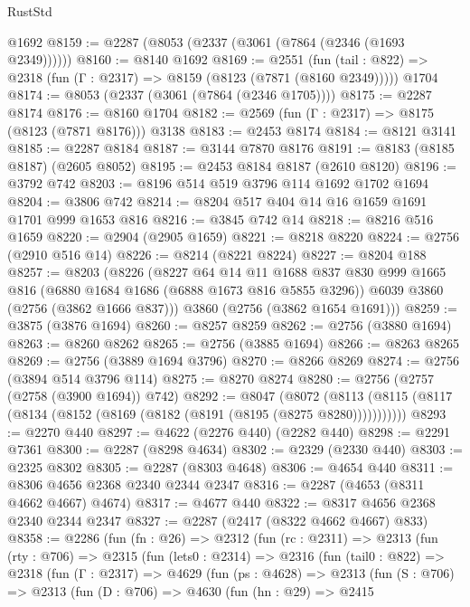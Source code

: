 \begin{lexlean}{RustStd}
\begin{coremodule}
    @1692
@8159 := @2287 (@8053 (@2337 (@3061 (@7864 (@2346 (@1693 @2349))))))
@8160 := @8140 @1692
@8169 := @2551
    (fun (tail : @822) => @2318 (fun (Γ : @2317) => @8159 (@8123 (@7871 (@8160 @2349)))))
    @1704
@8174 := @8053 (@2337 (@3061 (@7864 (@2346 @1705))))
@8175 := @2287 @8174
@8176 := @8160 @1704
@8182 := @2569 (fun (Γ : @2317) => @8175 (@8123 (@7871 @8176))) @3138
@8183 := @2453 @8174
@8184 := @8121 @3141
@8185 := @2287 @8184
@8187 := @3144 @7870 @8176
@8191 := @8183 (@8185 @8187) (@2605 @8052)
@8195 := @2453 @8184 @8187 (@2610 @8120)
@8196 := @3792 @742
@8203 := @8196 @514 @519 @3796 @114 @1692 @1702 @1694
@8204 := @3806 @742
@8214 := @8204 @517 @404 @14 @16 @1659 @1691 @1701 @999 @1653 @816
@8216 := @3845 @742 @14
@8218 := @8216 @516 @1659
@8220 := @2904 (@2905 @1659)
@8221 := @8218 @8220
@8224 := @2756 (@2910 @516 @14)
@8226 := @8214 (@8221 @8224)
@8227 := @8204 @188
@8257 := @8203
    (@8226
      (@8227
        @64
        @14
        @11
        @1688
        @837
        @830
        @999
        @1665
        @816
        (@6880 @1684 @1686 (@6888 @1673 @816 @5855 @3296))
        @6039
        @3860
        (@2756 (@3862 @1666 @837)))
      @3860
      (@2756 (@3862 @1654 @1691)))
@8259 := @3875 (@3876 @1694)
@8260 := @8257 @8259
@8262 := @2756 (@3880 @1694)
@8263 := @8260 @8262
@8265 := @2756 (@3885 @1694)
@8266 := @8263 @8265
@8269 := @2756 (@3889 @1694 @3796)
@8270 := @8266 @8269
@8274 := @2756 (@3894 @514 @3796 @114)
@8275 := @8270 @8274
@8280 := @2756 (@2757 (@2758 (@3900 @1694)) @742)
@8292 := @8047
    (@8072 (@8113 (@8115 (@8117 (@8134 (@8152 (@8169 (@8182 (@8191 (@8195 (@8275 @8280)))))))))))
@8293 := @2270 @440
@8297 := @4622 (@2276 @440) (@2282 @440)
@8298 := @2291 @7361
@8300 := @2287 (@8298 @4634)
@8302 := @2329 (@2330 @440)
@8303 := @2325 @8302
@8305 := @2287 (@8303 @4648)
@8306 := @4654 @440
@8311 := @8306 @4656 @2368 @2340 @2344 @2347
@8316 := @2287 (@4653 (@8311 @4662 @4667) @4674)
@8317 := @4677 @440
@8322 := @8317 @4656 @2368 @2340 @2344 @2347
@8327 := @2287 (@2417 (@8322 @4662 @4667) @833)
@8358 := @2286
    (fun (fn : @26) =>
    @2312
      (fun (rc : @2311) =>
      @2313
        (fun (rty : @706) =>
        @2315
          (fun (lets0 : @2314) =>
          @2316
            (fun (tail0 : @822) =>
            @2318
              (fun (Γ : @2317) =>
              @4629
                (fun (ps : @4628) =>
                @2313
                  (fun (S : @706) =>
                  @2313
                    (fun (D : @706) =>
                    @4630
                      (fun (hn : @29) =>
                      @2415

\end{coremodule}
\end{lexlean}
